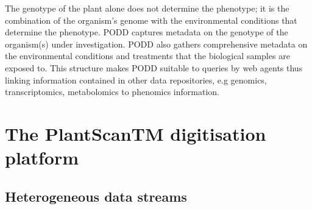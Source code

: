 \documentclass{llncs}
\begin{document}
The genotype of the plant alone does not determine the phenotype; it is the
combination of the organism’s genome with the environmental conditions that
determine the phenotype. PODD captures metadata on the genotype of the
organism(s) under investigation. PODD also gathers comprehensive metadata on the
environmental conditions and treatments that the biological samples are exposed
to. This structure makes PODD suitable to queries by web agents thus  linking
information contained in other data repositories, e.g genomics, transcriptomics,
metabolomics to phenomics information.  


\section{The PlantScanTM digitisation platform}


\subsection{Heterogeneous data streams}
\end{document}

